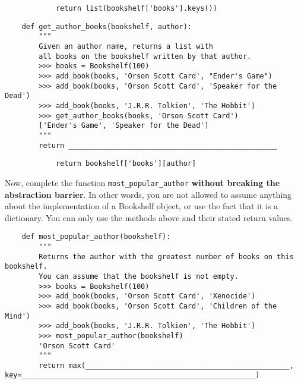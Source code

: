     \begin{solution}[1in]
        \begin{lstlisting}
            return list(bookshelf['books'].keys())
        \end{lstlisting}
    \end{solution}

    \begin{lstlisting}
    def get_author_books(bookshelf, author):
        """
        Given an author name, returns a list with
        all books on the bookshelf written by that author.
        >>> books = Bookshelf(100)
        >>> add_book(books, 'Orson Scott Card', "Ender's Game")
        >>> add_book(books, 'Orson Scott Card', 'Speaker for the Dead')
        >>> add_book(books, 'J.R.R. Tolkien', 'The Hobbit')
        >>> get_author_books(books, 'Orson Scott Card')
        ['Ender's Game', 'Speaker for the Dead']
        """
        return _________________________________________________
    \end{lstlisting}

    \begin{solution}[1in]
        \begin{lstlisting}
            return bookshelf['books'][author] 
        \end{lstlisting}
    \end{solution}

    \newpage
    Now, complete the function \lstinline{most_popular_author} \textbf{without breaking the abstraction barrier}.
    In other words, you are not allowed to assume anything about the implementation of a Bookshelf object, or
    use the fact that it is a dictionary. You can only use the methods above and their stated return values.

    \begin{lstlisting}
    def most_popular_author(bookshelf):
        """
        Returns the author with the greatest number of books on this bookshelf.
        You can assume that the bookshelf is not empty.
        >>> books = Bookshelf(100)
        >>> add_book(books, 'Orson Scott Card', 'Xenocide')
        >>> add_book(books, 'Orson Scott Card', 'Children of the Mind')
        >>> add_book(books, 'J.R.R. Tolkien', 'The Hobbit')
        >>> most_popular_author(bookshelf)
        'Orson Scott Card'
        """
        return max(________________________________________________, key=_______________________________________________________)
    \end{lstlisting}


